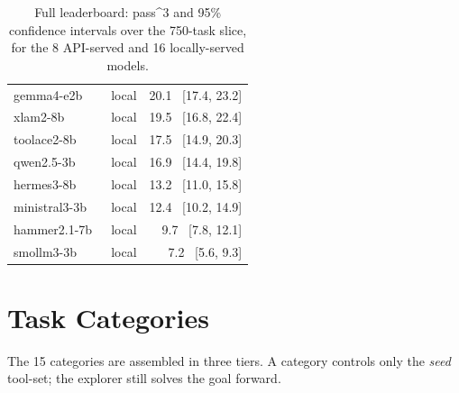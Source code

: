 \begin{table}[t]
\begin{tabular}{llr}
    gemma4-e2b~\cite{gemma4google} & local & 20.1 \, [17.4, 23.2] \\
    xlam2-8b~\cite{zhang2024xlamfamilylargeaction} & local & 19.5 \, [16.8, 22.4] \\
    toolace2-8b~\cite{liu2025toolacewinningpointsllm} & local & 17.5 \, [14.9, 20.3] \\
    qwen2.5-3b~\cite{qwen2025qwen25technicalreport} & local & 16.9 \, [14.4, 19.8] \\
    hermes3-8b~\cite{teknium2024hermes3technicalreport} & local & 13.2 \, [11.0, 15.8] \\
    ministral3-3b~\cite{liu2026ministral3} & local & 12.4 \, [10.2, 14.9] \\
    hammer2.1-7b~\cite{lin2024hammerrobustfunctioncallingondevice} & local & 9.7 \, [7.8, 12.1] \\
    smollm3-3b~\cite{bakouch2025smollm3} & local & 7.2 \, [5.6, 9.3] \\
    \bottomrule
  \end{tabular}
  \caption{Full leaderboard: pass\textasciicircum{}3 and 95\% confidence
    intervals over the 750-task slice, for the 8 API-served and 16
    locally-served models.}
  \label{tab:leaderboard}
\end{table}

\section{Task Categories}
\label{app:categories}
The 15 categories are assembled in three tiers. A category controls only the
\emph{seed} tool-set; the explorer still solves the goal forward.

